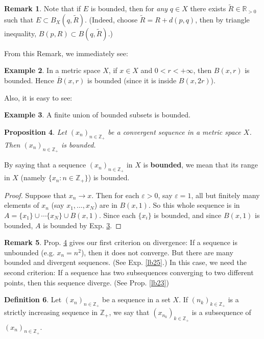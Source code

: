 \documentclass[12pt,b5paper,notitlepage]{article}
\theoremstyle{definition}
\newtheorem{df}{Definition}[section]
\newtheorem{eg}[df]{Example}
\newtheorem{rem}[df]{Remark}
\theoremstyle{plain}
\newtheorem{pp}[df]{Proposition}
\newcommand{\wtd}{\widetilde}
\newcommand{\ovl}{\overline}
\newcommand{\Zbb}{\mathbb Z}
\newcommand{\Rbb}{\mathbb R}
\numberwithin{equation}{section}
\begin{document}
\begin{rem}
Note that if $E$ is bounded, then  for \emph{any} $q\in X$ there exists $\wtd R\in\Rbb_{>0}$ such that $E\subset B_X(q,\wtd R)$. (Indeed, choose $\wtd R=R+d(p,q)$, then by triangle inequality, $B(p,R)\subset B(q,\wtd R)$.)
\end{rem}

From this Remark, we immediately see:
\begin{eg}
In a metric space $X$, if $x\in X$ and $0<r<+\infty$, then $B(x,r)$ is bounded. Hence $\ovl B(x,r)$ is bounded (since it is inside $B(x,2r)$).
\end{eg}

Also, it is easy to see:
\begin{eg}\label{lb22}
A finite union of bounded subsets is bounded.
\end{eg}

\begin{pp}\label{lb24}
Let $(x_n)_{n\in\Zbb_+}$ be a convergent sequence in a metric space $X$. Then $(x_n)_{n\in\Zbb_+}$ is bounded.
\end{pp}

By saying that a sequence  $(x_n)_{n\in\Zbb_+}$ in $X$ is \textbf{bounded}, we mean that its range in $X$ (namely $\{x_n:n\in\Zbb_+\}$) is bounded.

\begin{proof}
Suppose that $x_n\rightarrow x$. Then for each $\varepsilon>0$, say $\varepsilon=1$, all but finitely many elements of $x_n$ (say $x_1,\dots,x_N$) are in $B(x,1)$. So this whole sequence is in $A=\{x_1\}\cup\cdots\{x_N\}\cup B(x,1)$. Since each $\{x_i\}$ is bounded, and since $B(x,1)$ is bounded, $A$ is bounded by Exp. \ref{lb22}.
\end{proof}


\begin{rem}\label{lb26}
Prop. \ref{lb24} gives our first criterion on divergence: If a sequence is unbounded (e.g. $x_n=n^2$), then it does not converge. But there are many bounded and divergent sequences. (See Exp. \ref{lb25}.) In this case, we need the second criterion: If a sequence has two subsequences converging to two different points, then this sequence diverge. (See Prop. \ref{lb23})
\end{rem}




\begin{df}
Let $(x_n)_{n\in\Zbb_+}$ be a sequence in a set $X$. If $(n_k)_{k\in\Zbb_+}$ is a strictly increasing sequence in $\Zbb_+$, we say that $(x_{n_k})_{k\in\Zbb_+}$ is a subsequence of $(x_n)_{n\in\Zbb_+}$. 
\end{df}
\end{document}
